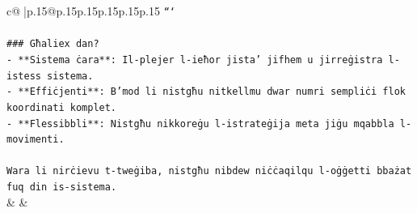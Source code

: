 \documentclass{article}
\begin{document}
{\begin{supertabular}{c@{$\;$}|p{.15\linewidth}@{}p{.15\linewidth}p{.15\linewidth}p{.15\linewidth}p{.15\linewidth}p{.15\linewidth}}
{{{\texttt{```} \\
\\ 
\texttt{\#\#\# Għaliex dan?} \\
\texttt{{-} **Sistema ċara**: Il{-}plejer l{-}ieħor jista' jifhem u jirreġistra l{-}istess sistema.} \\
\texttt{{-} **Effiċjenti**: B'mod li nistgħu nitkellmu dwar numri sempliċi flok koordinati komplet.} \\
\texttt{{-} **Flessibbli**: Nistgħu nikkoreġu l{-}istrateġija meta jiġu mqabbla l{-}movimenti.} \\
\\ 
\texttt{Wara li nirċievu t{-}tweġiba, nistgħu nibdew niċċaqilqu l{-}oġġetti bbażat fuq din is{-}sistema.} \\
            }
        }
    }
    & & \\ \\


\end{supertabular}}
\end{document}
